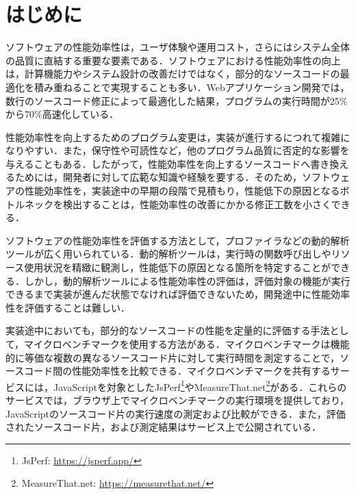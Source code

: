 \documentclass[submit,techrep,noauthor]{ipsj}
\begin{document}
\maketitle

\section{はじめに}

 ソフトウェアの性能効率性は，ユーザ体験や運用コスト，さらにはシステム全体の品質に直結する重要な要素である\cite{performance1}\cite{performance2}\cite{negative}．ソフトウェアにおける性能効率性の向上は，計算機能力やシステム設計の改善だけではなく，部分的なソースコードの最適化を積み重ねることで実現することも多い．Webアプリケーション開発では，数行のソースコード修正によって最適化した結果，プログラムの実行時間が25\%から70\%高速化している\cite{jsRefac}．

性能効率性を向上するためのプログラム変更は，実装が進行するにつれて複雑になりやすい\cite{complicate}．また，保守性や可読性など，他のプログラム品質に否定的な影響を与えることもある\cite{negative}．したがって，性能効率性を向上するソースコードへ書き換えるためには，開発者に対して広範な知識や経験を要する．そのため，ソフトウェアの性能効率性を，実装途中の早期の段階で見積もり，性能低下の原因となるボトルネックを検出することは，性能効率性の改善にかかる修正工数を小さくできる．

ソフトウェアの性能効率性を評価する方法として，プロファイラなどの動的解析ツールが広く用いられている．動的解析ツールは，実行時の関数呼び出しやリソース使用状況を精緻に観測し，性能低下の原因となる箇所を特定することができる．しかし，動的解析ツールによる性能効率性の評価は，評価対象の機能が実行できるまで実装が進んだ状態でなければ評価できないため，開発途中に性能効率性を評価することは難しい．

実装途中においても，部分的なソースコードの性能を定量的に評価する手法として，マイクロベンチマークを使用する方法がある．マイクロベンチマークは機能的に等価な複数の異なるソースコード片に対して実行時間を測定することで，ソースコード間の性能効率性を比較できる．マイクロベンチマークを共有するサービスには，JavaScriptを対象としたJsPerf\footnote{JsPerf: \url{https://jsperf.app/}}やMeasureThat.net\footnote{MeasureThat.net: \url{https://measurethat.net/}}がある．これらのサービスでは，ブラウザ上でマイクロベンチマークの実行環境を提供しており，JavaScriptのソースコード片の実行速度の測定および比較ができる．また，評価されたソースコード片，および測定結果はサービス上で公開されている．
\end{document}
